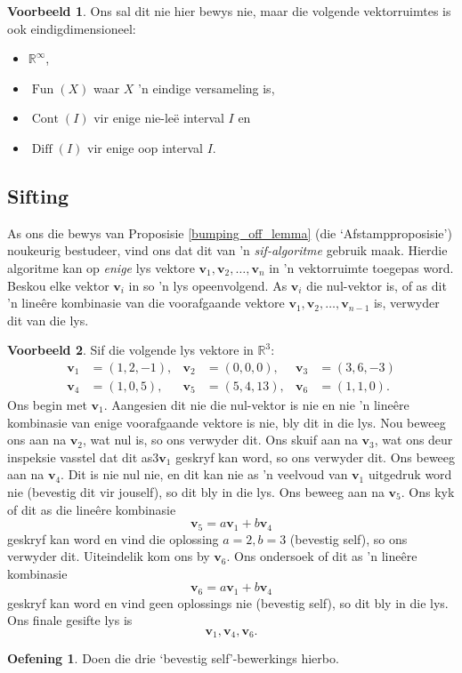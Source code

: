 \documentclass[a4paper,11pt]{book}
\theoremstyle{definition}
\newtheorem{exercise}{Oefening}
\newtheorem{example_environment}{Voorbeeld}[chapter]
\newcommand{\ve}[1]{\mathbf{#1}}
\newenvironment{example}
	{
		\begin{oframed}
		\begin{example_environment}
	}
	{
		\end{example_environment}
		\end{oframed}
	}
\DeclareMathOperator{\Fun}{Fun}
\DeclareMathOperator{\Cont}{Cont}
\DeclareMathOperator{\Diff}{Diff}
\begin{document}
\begin{example} Ons sal dit nie hier bewys nie, maar die volgende
	vektorruimtes is ook eindigdimensioneel:
	\begin{itemize}
		\item $\mathbb{R}^\infty$,
		\item $\Fun(X)$ waar $X$ 'n eindige versameling is,
		\item $\Cont(I)$ vir enige nie-le{\"e} interval $I$ en
		\item $\Diff(I)$ vir enige oop interval $I$.
	\end{itemize}
\end{example}


\subsection{Sifting} \label{sifting_subsection}
As ons die bewys van Proposisie \ref{bumping_off_lemma} (die
`Afstampproposisie') noukeurig bestudeer, vind ons dat dit van 'n
\emph{sif-algoritme} gebruik maak. Hierdie algoritme kan op \emph{enige}
lys vektore $\ve{v}_1, \ve{v}_2, \ldots, \ve{v}_n$ in 'n vektorruimte
toegepas word. Beskou elke vektor $\ve{v}_i$ in so 'n lys
opeenvolgend. As $\ve{v}_i$ die nul-vektor is, of as dit 'n line{\^e}re
kombinasie van die voorafgaande vektore $\ve{v}_1, \ve{v}_2, \ldots,
\ve{v}_{n-1}$ is, verwyder dit van die lys.

\begin{example} Sif die volgende lys vektore in $\mathbb{R}^3$:
	\begin{align*}
		\ve{v}_1 &= (1,2,-1), & \ve{v}_2 &= (0, 0, 0), & \ve{v}_3 &= (3, 6,
		-3) \\
		\ve{v}_4 &= (1, 0, 5), & \ve{v}_5 &= (5, 4, 13), &  \ve{v}_6 &= (1,
		1, 0).
	\end{align*}
	Ons begin met $\ve{v}_1$. Aangesien dit nie die nul-vektor is nie en
	nie 'n line{\^e}re kombinasie van enige voorafgaande vektore is nie,
	bly dit in die lys. Nou beweeg ons aan na $\ve{v}_2$, wat nul is, so
	ons verwyder dit. Ons skuif aan na $\ve{v}_3$, wat ons deur inspeksie
	vasstel dat dit as$3 \ve{v}_1$ geskryf kan word, so ons verwyder dit.
	Ons beweeg aan na $\ve{v}_4$. Dit is nie nul nie, en dit kan nie as 'n
	veelvoud van $\ve{v}_1$ uitgedruk word nie (bevestig dit vir jouself),
	so dit bly in die lys. Ons beweeg aan na $\ve{v}_5$. Ons kyk of dit as
	die line{\^e}re kombinasie 
	\[
		\ve{v}_5 = a\ve{v}_1 + b \ve{v}_4
	\] 
	geskryf kan word en vind die oplossing $a=2, b=3$ (bevestig self), so
	ons verwyder dit. Uiteindelik kom ons by $\ve{v}_6$. Ons ondersoek of
	dit as 'n line{\^e}re kombinasie
	\[
		\ve{v}_6 = a\ve{v}_1 + b \ve{v}_4
	\] 
	geskryf kan word en vind geen oplossings nie (bevestig self), so dit
	bly in die lys. Ons finale gesifte lys is
	\[
		\ve{v}_1, \ve{v}_4, \ve{v}_6.
	\]
	\begin{exercise} Doen die drie `bevestig self'-bewerkings hierbo.
	\end{exercise}
\end{example}
\end{document}
